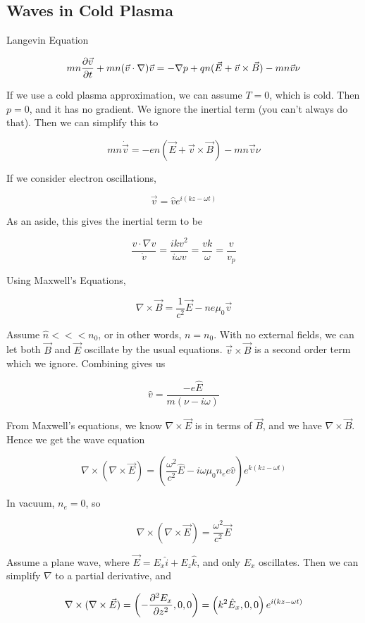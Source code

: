 \documentclass[12pt]{article}
\begin{document}
\subsection{Waves in Cold Plasma}

Langevin Equation

$$mn \frac{\partial \vec v}{\partial t} + mn(\vec v \cdot \nabla)\vec v = -\nabla p + qn(\vec E + \vec v \times \vec B) - mn\vec v \nu$$

If we use a cold plasma approximation, we can assume $T = 0$, which is cold. Then $p = 0$, and it has no gradient. We ignore the inertial term (you can't always do that). Then we can simplify this to

$$mn\dot{\vec v} = -en(\vec E + \vec v \times \vec B) - mn\vec v \nu$$

If we consider electron oscillations,

$$\vec v = \hat v e^{i(kz-\omega t)}$$

As an aside, this gives the inertial term to be

$$\frac{v \cdot \nabla v}{\dot{v}} = \frac{ikv^2}{i\omega v} = \frac{vk}{\omega} = \frac{v}{v_p}$$

Using Maxwell's Equations,

$$\nabla \times \vec B = \frac{1}{c^2} \vec E - ne\mu_0\vec v$$

Assume $\hat n <<< n_0$, or in other words, $n = n_0$. With no external fields, we can let both $\vec B$ and $\vec E$ oscillate by the usual equations. $\vec v \times \vec B$ is a second order term which we ignore. Combining gives us

$$\hat v = \frac{-e\hat E}{m(\nu-i\omega)}$$

From Maxwell's equations, we know $\nabla \times \vec E$ is in terms of $\vec B$, and we have $\nabla \times \vec B$. Hence we get the wave equation

$$\nabla \times (\nabla \times \vec E) = \left(\frac{\omega^2}{c^2}\hat E - i\omega \mu_0n_ee\hat v\right)e^{k(kz-\omega t)}$$

In vacuum, $n_e = 0$, so

$$\nabla \times (\nabla \times \vec E) = \frac{\omega^2}{c^2} \vec E$$

Assume a plane wave, where $\vec E = E_x\hat i + E_z \hat k$, and only $E_x$ oscillates. Then we can simplify $\nabla$ to a partial derivative, and

$$\nabla \times (\nabla \times \vec E) = \left(-\frac{\partial ^2E_x}{\partial z^2}, 0, 0\right) = \left(k^2\hat E_x, 0, 0\right) e^{i(kz-\omega t)}$$
\end{document}
